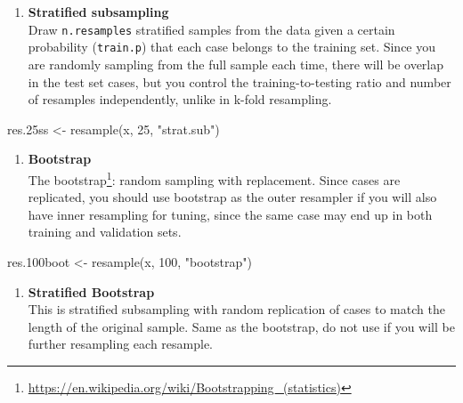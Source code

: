 \documentclass[
]{book}
\newenvironment{Shaded}{\begin{snugshade}}{\end{snugshade}}
\newcommand{\DecValTok}[1]{\textcolor[rgb]{0.00,0.00,0.81}{#1}}
\newcommand{\FloatTok}[1]{\textcolor[rgb]{0.00,0.00,0.81}{#1}}
\newcommand{\FunctionTok}[1]{\textcolor[rgb]{0.00,0.00,0.00}{#1}}
\newcommand{\NormalTok}[1]{#1}
\newcommand{\OtherTok}[1]{\textcolor[rgb]{0.56,0.35,0.01}{#1}}
\newcommand{\StringTok}[1]{\textcolor[rgb]{0.31,0.60,0.02}{#1}}
\providecommand{\tightlist}{%
  \setlength{\itemsep}{0pt}\setlength{\parskip}{0pt}}
\renewcommand{\href}[2]{#2\footnote{\url{#1}}}
\begin{document}
\begin{enumerate}
\def\labelenumi{\arabic{enumi}.}
\setcounter{enumi}{1}
\tightlist
\item
  \textbf{Stratified subsampling}\\
  Draw \texttt{n.resamples} stratified samples from the data given a certain probability (\texttt{train.p}) that each case belongs to the training set. Since you are randomly sampling from the full sample each time, there will be overlap in the test set cases, but you control the training-to-testing ratio and number of resamples independently, unlike in k-fold resampling.
\end{enumerate}

\begin{Shaded}
\begin{Highlighting}[]
\NormalTok{res}\FloatTok{.25}\NormalTok{ss }\OtherTok{\textless{}{-}} \FunctionTok{resample}\NormalTok{(x, }\DecValTok{25}\NormalTok{, }\StringTok{"strat.sub"}\NormalTok{)}
\end{Highlighting}
\end{Shaded}

\begin{enumerate}
\def\labelenumi{\arabic{enumi}.}
\setcounter{enumi}{2}
\tightlist
\item
  \textbf{Bootstrap}\\
  The \href{https://en.wikipedia.org/wiki/Bootstrapping_(statistics)}{bootstrap}: random sampling with replacement. Since cases are replicated, you should use bootstrap as the outer resampler if you will also have inner resampling for tuning, since the same case may end up in both training and validation sets.
\end{enumerate}

\begin{Shaded}
\begin{Highlighting}[]
\NormalTok{res}\FloatTok{.100}\NormalTok{boot }\OtherTok{\textless{}{-}} \FunctionTok{resample}\NormalTok{(x, }\DecValTok{100}\NormalTok{, }\StringTok{"bootstrap"}\NormalTok{)}
\end{Highlighting}
\end{Shaded}

\begin{enumerate}
\def\labelenumi{\arabic{enumi}.}
\setcounter{enumi}{3}
\tightlist
\item
  \textbf{Stratified Bootstrap}\\
  This is stratified subsampling with random replication of cases to match the length of the original sample. Same as the bootstrap, do not use if you will be further resampling each resample.
\end{enumerate}
\end{document}
